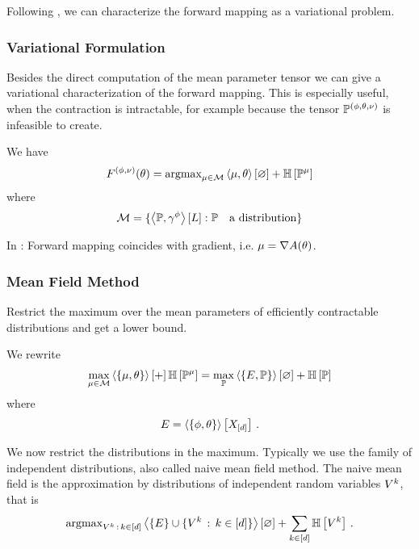 Following \cite{wainwright_graphical_2008}, we can characterize the forward mapping as a variational problem.



\subsubsection{Variational Formulation}

Besides the direct computation of the mean parameter tensor we can give a variational characterization of the forward mapping.
This is especially useful, when the contraction is intractable, for example because the tensor $\mathbb{P}^{(\phi,\theta,\nu)}$ is infeasible to create.

We have
\begin{align*}
	F^{(\phi,\nu)}(\theta)  = \mathrm{argmax}_{\mu\in\mathcal{M}}  \left\langle \mu,\theta\right\rangle \left[ \varnothing \right] + \mathbb{H}\left[\mathbb{P}^{\mu}\right] 
\end{align*}
where 
\begin{align*}
	 \mathcal{M} = \{  \left\langle \mathbb{P},\gamma^{\phi}\right\rangle \left[ L \right]  :  \mathbb{P} \quad \text{a distribution} \}
\end{align*}

In \cite{wainwright_graphical_2008}: Forward mapping coincides with gradient, i.e. $\mu = \nabla A(\theta)$.


\subsubsection{Mean Field Method}

Restrict the maximum over the mean parameters of efficiently contractable distributions and get a lower bound.

We rewrite 
\begin{align*}
	\max_{\mu\in\mathcal{M}}  \left\langle \left\{\mu, \theta\right\}\right\rangle \left[ + \right] \mathbb{H}\left[\mathbb{P}^{\mu}\right] 
	=
	\max_{\mathbb{P}} \left\langle \left\{E, \mathbb{P}\right\}\right\rangle \left[ \varnothing \right] + \mathbb{H}\left[\mathbb{P}\right]
\end{align*}
where
	\[ E = \left\langle \left\{\phi,\theta\right\}\right\rangle \left[ X_{[d]} \right] \, . \]

We now restrict the distributions in the maximum.
Typically we use the family of independent distributions, also called naive mean field method.
The naive mean field is the approximation by distributions of independent random variables $V^{k}$, that is
\begin{align*}
	\mathrm{argmax}_{V^{k} \, : \, k\in[d]} \left\langle \{E\} \cup \{V^{k} \, : \, k\in[d]\}\right\rangle \left[ \varnothing \right]
	+ \sum_{k\in[d]} \mathbb{H}\left[V^{k}\right] \, . 
\end{align*}

